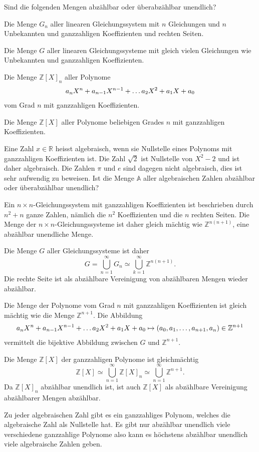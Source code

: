 Sind die folgenden Mengen abzählbar oder überabzählbar unendlich?
\begin{teilaufgaben}
\item
Die Menge $G_n$ aller linearen Gleichungssystem mit $n$ Gleichungen
und $n$ Unbekannten und ganzzahligen Koeffizienten und rechten Seiten.
\item
Die Menge $G$ aller linearen Gleichungssysteme mit gleich vielen Gleichungen
wie Unbekannten und ganzzahligen Koeffizienten.
\item
Die Menge $\mathbb Z[X]_n$ aller Polynome
\[
a_{\mathstrut n}X^n+a_{n-1}X^{n-1}+\dots a_2X^2+a_1X+a_0
\]
vom Grad $n$ mit ganzzahligen Koeffizienten.
\item
Die Menge $\mathbb Z[X]$ aller Polynome
beliebigen Grades $n$ mit ganzzahligen Koeffizienten.
\item
Eine Zahl $x\in \mathbb R$ heisst algebraisch, wenn sie Nullstelle
eines Polynoms mit ganzzahligen Koeffizienten ist.
Die Zahl $\sqrt{2}$ ist Nullstelle von $X^2-2$ und ist daher algebraisch.
Die Zahlen $\pi$ und $e$ sind dagegen nicht algebraisch, dies ist sehr
aufwendig zu beweisen.
Ist die Menge $\mathbb{A}$ aller algebraischen Zahlen abzählbar oder
überabzählbar unendlich?
\end{teilaufgaben}

\begin{loesung}
\begin{teilaufgaben}
\item
Ein $n\times n$-Gleichungssystem mit ganzzahligen 
Koeffizienten ist beschrieben durch $n^2+n$ ganze Zahlen, nämlich
die $n^2$ Koeffizienten und die $n$ rechten Seiten.
Die Menge der $n\times n$-Gleichungssysteme ist daher gleich
mächtig wie $\mathbb Z^{n(n+1)}$, eine abzählbar unendliche Menge.
\item
Die Menge $G$ aller Gleichungssysteme ist daher 
\[
G = \bigcup_{n=1}^\infty G_n \simeq \bigcup_{k=1}^\infty \mathbb Z^{n(n+1)}.
\]
Die rechte Seite ist als abzählbare Vereinigung von abzählbaren Mengen
wieder abzählbar.
\item
Die Menge der Polynome vom Grad $n$ mit ganzzahligen Koeffizienten
ist gleich mächtig wie die Menge $\mathbb Z^{n+1}$.
Die Abbildung
\[
a_{\mathstrut n}X^n+a_{n-1}X^{n-1}+\dots a_2X^2+a_1X+a_0
\mapsto
(a_0,a_1,\dots,a_{n+1},a_{\mathstrut n}) \in \mathbb{Z}^{n+1}
\]
vermittelt die bijektive Abbildung zwischen $G$ und $\mathbb Z^{n+1}$.
\item
Die Menge $\mathbb Z[X]$ der ganzzahligen Polynome ist gleichmächtig
\[
\mathbb Z[X]
\simeq
\bigcup_{n=1}^\infty \mathbb Z[X]_n
\simeq
\bigcup_{n=1}^\infty \mathbb Z^{n+1}.
\]
Da $\mathbb Z[X]_n$ abzählbar unendlich ist, ist auch $\mathbb Z[X]$
als abzählbare Vereinigung abzählbarer Mengen abzählbar.
\item
Zu jeder algebraischen Zahl gibt es ein ganzzahliges Polynom, welches
die algebraische Zahl als Nullstelle hat.
Es gibt nur abzählbar unendlich viele verschiedene ganzzahlige Polynome
also kann es höchstens abzählbar unendlich viele algebraische Zahlen geben.
\qedhere
\end{teilaufgaben}
\end{loesung}



